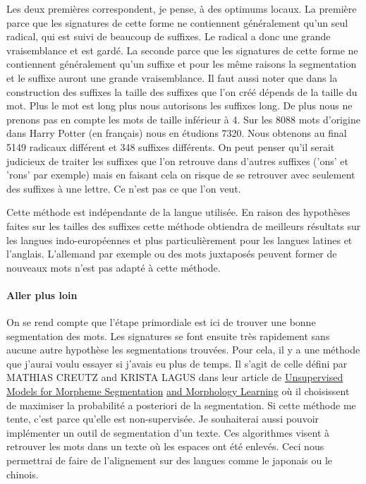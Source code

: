 \documentclass[11pt, oneside]{article}   	%
\begin{document}
Les deux premières correspondent, je pense, à des optimums locaux. La première parce que les signatures de cette forme ne contiennent généralement qu'un seul radical, qui est suivi de beaucoup de suffixes. Le radical a donc une 
grande vraisemblance et est gardé. La seconde parce que les signatures de cette forme ne contiennent généralement qu'un suffixe et pour les même raisons la segmentation et le suffixe auront une grande vraisemblance. Il faut aussi noter que dans la construction des suffixes la taille des suffixes que l'on créé dépends de la taille du mot. Plus le mot est long plus nous autorisons les suffixes long. De plus nous ne prenons pas en compte les mots de taille inférieur à 4. Sur les 8088 mots d'origine dans Harry Potter (en français) nous en étudions 7320. Nous obtenons au final 5149 radicaux différent et 348 suffixes différents. On peut penser qu'il serait judicieux de traiter les suffixes que l'on retrouve dans d'autres suffixes ('ons' et 'rons' par exemple) mais en faisant cela on risque de se retrouver avec seulement des suffixes à une lettre. Ce n'est pas ce que l'on veut.

Cette méthode est indépendante de la langue utilisée. En raison des hypothèses faites sur les tailles des suffixes cette méthode obtiendra de meilleurs résultats sur les langues indo-européennes et plus particulièrement pour les langues latines et l'anglais. L'allemand par exemple ou des mots juxtaposés peuvent former de nouveaux mots n'est pas adapté à cette méthode. 


\paragraph{Aller plus loin}

On se rend compte que l'étape primordiale est ici de trouver une bonne segmentation des mots. Les signatures se font ensuite très rapidement sans aucune autre hypothèse les segmentations trouvées. Pour cela, il y a une méthode que j'aurai voulu essayer si j'avais eu plus de temps. Il s'agit de celle défini par MATHIAS CREUTZ and KRISTA LAGUS dans leur article de \underline{Unsupervised Models for Morpheme Segmentation} \underline{and Morphology Learning} où il choisissent de maximiser la probabilité a posteriori de la segmentation. Si cette méthode me tente, c'est parce qu'elle est non-supervisée. Je souhaiterai aussi pouvoir implémenter un outil de segmentation d'un texte. Ces algorithmes visent à retrouver les mots dans un texte où les espaces ont été enlevés. Ceci nous permettrai de faire de l'alignement sur des langues comme le japonais ou le chinois.

 
\end{document}
